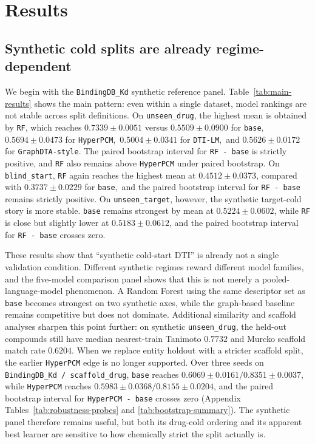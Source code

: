 \section{Results}

\subsection{Synthetic cold splits are already regime-dependent}

We begin with the \texttt{BindingDB\_Kd} synthetic reference panel. Table~\ref{tab:main-results} shows the main pattern: even within a single dataset, model rankings are not stable across split definitions. On \texttt{unseen\_drug}, the highest mean \AUPRC{} is obtained by \texttt{RF}, which reaches $0.7339 \pm 0.0051$ versus $0.5509 \pm 0.0900$ for \texttt{base}$,$ $0.5694 \pm 0.0473$ for \texttt{HyperPCM}$,$ $0.5004 \pm 0.0341$ for \texttt{DTI-LM}$,$ and $0.5626 \pm 0.0172$ for \texttt{GraphDTA-style}. The paired bootstrap interval for \texttt{RF - base} is strictly positive, and \texttt{RF} also remains above \texttt{HyperPCM} under paired bootstrap. On \texttt{blind\_start}, \texttt{RF} again reaches the highest mean \AUPRC{} at $0.4512 \pm 0.0373$, compared with $0.3737 \pm 0.0229$ for \texttt{base}$,$ and the paired bootstrap interval for \texttt{RF - base} remains strictly positive. On \texttt{unseen\_target}, however, the synthetic target-cold story is more stable. \texttt{base} remains strongest by mean \AUPRC{} at $0.5224 \pm 0.0602$, while \texttt{RF} is close but slightly lower at $0.5183 \pm 0.0612$, and the paired bootstrap interval for \texttt{RF - base} crosses zero.



These results show that ``synthetic cold-start DTI'' is already not a single validation condition. Different synthetic regimes reward different model families, and the five-model comparison panel shows that this is not merely a pooled-language-model phenomenon. A Random Forest using the same descriptor set as \texttt{base} becomes strongest on two synthetic axes, while the graph-based baseline remains competitive but does not dominate. Additional similarity and scaffold analyses sharpen this point further: on synthetic \texttt{unseen\_drug}, the held-out compounds still have median nearest-train Tanimoto $0.7732$ and Murcko scaffold match rate $0.6204$. When we replace entity holdout with a stricter scaffold split, the earlier \texttt{HyperPCM} edge is no longer supported. Over three seeds on \texttt{BindingDB\_Kd / scaffold\_drug}, \texttt{base} reaches $0.6069 \pm 0.0161 / 0.8351 \pm 0.0037$, while \texttt{HyperPCM} reaches $0.5983 \pm 0.0368 / 0.8155 \pm 0.0204$, and the paired bootstrap interval for \texttt{HyperPCM - base} crosses zero (Appendix Tables~\ref{tab:robustness-probes} and \ref{tab:bootstrap-summary}). The synthetic panel therefore remains useful, but both its drug-cold ordering and its apparent best learner are sensitive to how chemically strict the split actually is.

